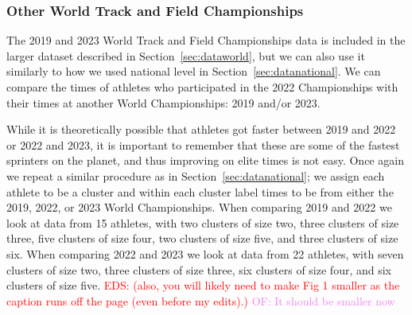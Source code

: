 \documentclass[12pt, letterpaper, titlepage]{article}
\newcommand{\eds}[1]{\textcolor{red}{EDS: (#1)}}
\newcommand{\of}[1]{\textcolor{violet}{OF: #1}}
\begin{document}

\subsubsection{Other World Track and Field Championships}\label{sec:data2019}
The 2019 and 2023 World Track and Field Championships data is included in the 
larger dataset described in Section~\ref{sec:dataworld}, but we can also use it
similarly to how we used national level in Section~\ref{sec:datanational}.  We
can compare the times of athletes who participated in the 2022 Championships with
their times at another World Championships: 2019 and/or 2023.


While it is theoretically possible that athletes got faster 
between 2019 and 2022 or 2022 and 2023, it is important to 
remember that these are some of the fastest sprinters on the planet, and thus
improving on elite times is not easy.  Once again we repeat a similar procedure
as in Section~\ref{sec:datanational}; we assign each athlete to be a cluster and
within each cluster label times to be from either the 2019, 2022, or 2023 World
Championships. When comparing 2019 and 2022 we look at data from 15
athletes, with two clusters of size two, three clusters of size three, five 
clusters of size four, two clusters of size five, and three clusters of size six.
When comparing 2022 and 2023 we look at data from 22 athletes, with seven 
clusters of size two, three clusters of size three, six clusters of size four,
and six clusters of size five.  
\eds{also, you will likely need to make Fig 1 smaller as the caption runs off
the page (even before my edits).}
\of{It should be smaller now}
\end{document}
